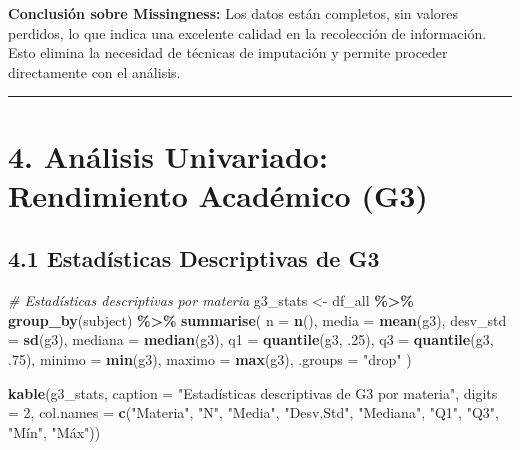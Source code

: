 \documentclass[
]{book}
\newenvironment{Shaded}{\begin{snugshade}}{\end{snugshade}}
\newcommand{\AttributeTok}[1]{\textcolor[rgb]{0.13,0.29,0.53}{#1}}
\newcommand{\CommentTok}[1]{\textcolor[rgb]{0.56,0.35,0.01}{\textit{#1}}}
\newcommand{\DecValTok}[1]{\textcolor[rgb]{0.00,0.00,0.81}{#1}}
\newcommand{\FunctionTok}[1]{\textcolor[rgb]{0.13,0.29,0.53}{\textbf{#1}}}
\newcommand{\NormalTok}[1]{#1}
\newcommand{\OtherTok}[1]{\textcolor[rgb]{0.56,0.35,0.01}{#1}}
\newcommand{\SpecialCharTok}[1]{\textcolor[rgb]{0.81,0.36,0.00}{\textbf{#1}}}
\newcommand{\StringTok}[1]{\textcolor[rgb]{0.31,0.60,0.02}{#1}}
\begin{document}
\textbf{Conclusión sobre Missingness:}
Los datos están completos, sin valores perdidos, lo que indica una excelente calidad en la recolección de información. Esto elimina la necesidad de técnicas de imputación y permite proceder directamente con el análisis.

\begin{center}\rule{0.5\linewidth}{0.5pt}\end{center}

\section{4. Análisis Univariado: Rendimiento Académico (G3)}\label{anuxe1lisis-univariado-rendimiento-acaduxe9mico-g3}

\subsection{4.1 Estadísticas Descriptivas de G3}\label{estaduxedsticas-descriptivas-de-g3}

\begin{Shaded}
\begin{Highlighting}[]
\CommentTok{\# Estadísticas descriptivas por materia}
\NormalTok{g3\_stats }\OtherTok{\textless{}{-}}\NormalTok{ df\_all }\SpecialCharTok{\%\textgreater{}\%} 
  \FunctionTok{group\_by}\NormalTok{(subject) }\SpecialCharTok{\%\textgreater{}\%}
  \FunctionTok{summarise}\NormalTok{(}
    \AttributeTok{n =} \FunctionTok{n}\NormalTok{(),}
    \AttributeTok{media =} \FunctionTok{mean}\NormalTok{(g3),}
    \AttributeTok{desv\_std =} \FunctionTok{sd}\NormalTok{(g3),}
    \AttributeTok{mediana =} \FunctionTok{median}\NormalTok{(g3),}
    \AttributeTok{q1 =} \FunctionTok{quantile}\NormalTok{(g3, .}\DecValTok{25}\NormalTok{),}
    \AttributeTok{q3 =} \FunctionTok{quantile}\NormalTok{(g3, .}\DecValTok{75}\NormalTok{),}
    \AttributeTok{minimo =} \FunctionTok{min}\NormalTok{(g3),}
    \AttributeTok{maximo =} \FunctionTok{max}\NormalTok{(g3),}
    \AttributeTok{.groups =} \StringTok{"drop"}
\NormalTok{  )}

\FunctionTok{kable}\NormalTok{(g3\_stats, }
      \AttributeTok{caption =} \StringTok{"Estadísticas descriptivas de G3 por materia"}\NormalTok{,}
      \AttributeTok{digits =} \DecValTok{2}\NormalTok{,}
      \AttributeTok{col.names =} \FunctionTok{c}\NormalTok{(}\StringTok{"Materia"}\NormalTok{, }\StringTok{"N"}\NormalTok{, }\StringTok{"Media"}\NormalTok{, }\StringTok{"Desv.Std"}\NormalTok{, }\StringTok{"Mediana"}\NormalTok{, }\StringTok{"Q1"}\NormalTok{, }\StringTok{"Q3"}\NormalTok{, }\StringTok{"Mín"}\NormalTok{, }\StringTok{"Máx"}\NormalTok{))}
\end{Highlighting}
\end{Shaded}
\end{document}

